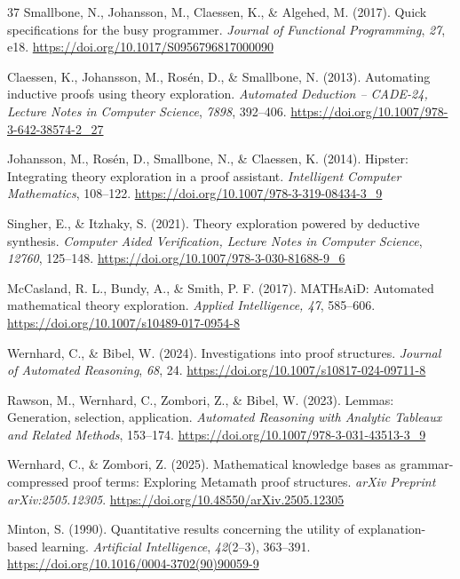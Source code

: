 \documentclass[pdflatex,sn-basic,Numbered]{sn-jnl}
\begin{document}
\begin{thebibliography}{37}
 Smallbone, N., Johansson, M., Claessen, K., \& Algehed, M. (2017). Quick specifications for the busy programmer. \emph{Journal of Functional Programming}, \emph{27}, e18. \url{https://doi.org/10.1017/S0956796817000090}

 Claessen, K., Johansson, M., Ros\'{e}n, D., \& Smallbone, N. (2013). Automating inductive proofs using theory exploration. \emph{Automated Deduction -- CADE-24, Lecture Notes in Computer Science}, \emph{7898}, 392--406. \url{https://doi.org/10.1007/978-3-642-38574-2_27}

 Johansson, M., Ros\'{e}n, D., Smallbone, N., \& Claessen, K. (2014). Hipster: Integrating theory exploration in a proof assistant. \emph{Intelligent Computer Mathematics}, 108--122. \url{https://doi.org/10.1007/978-3-319-08434-3_9}

 Singher, E., \& Itzhaky, S. (2021). Theory exploration powered by deductive synthesis. \emph{Computer Aided Verification, Lecture Notes in Computer Science}, \emph{12760}, 125--148. \url{https://doi.org/10.1007/978-3-030-81688-9_6}

 McCasland, R. L., Bundy, A., \& Smith, P. F. (2017). MATHsAiD: Automated mathematical theory exploration. \emph{Applied Intelligence, 47}, 585--606. \url{https://doi.org/10.1007/s10489-017-0954-8}

 Wernhard, C., \& Bibel, W. (2024). Investigations into proof structures. \emph{Journal of Automated Reasoning}, \emph{68}, 24. \url{https://doi.org/10.1007/s10817-024-09711-8}

 Rawson, M., Wernhard, C., Zombori, Z., \& Bibel, W. (2023). Lemmas: Generation, selection, application. \emph{Automated Reasoning with Analytic Tableaux and Related Methods}, 153--174. \url{https://doi.org/10.1007/978-3-031-43513-3_9}

 Wernhard, C., \& Zombori, Z. (2025). Mathematical knowledge bases as grammar-compressed proof terms: Exploring Metamath proof structures. \emph{arXiv Preprint arXiv:2505.12305}. \url{https://doi.org/10.48550/arXiv.2505.12305}

 Minton, S. (1990). Quantitative results concerning the utility of explanation-based learning. \emph{Artificial Intelligence}, \emph{42}(2--3), 363--391. \url{https://doi.org/10.1016/0004-3702(90)90059-9}


\end{thebibliography}
\end{document}
